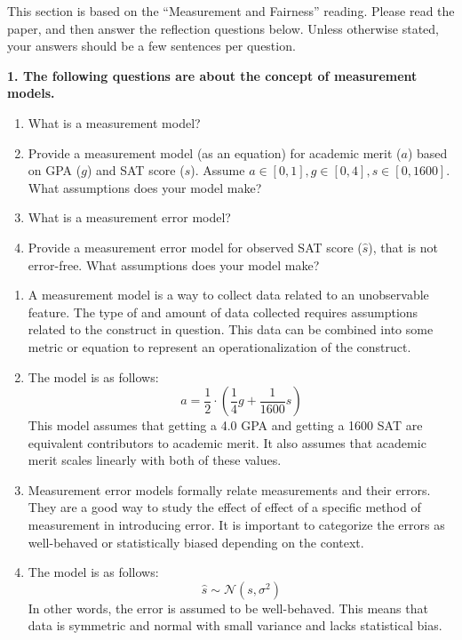 \documentclass{article}
\begin{document}
This section is based on the ``Measurement and Fairness'' reading. Please read the paper, and then answer the reflection questions below. Unless otherwise stated, your answers should be a few sentences per question.

\textbf{1. The following questions are about the concept of measurement models.}
\begin{enumerate}[label=\Alph*.]
    \item What is a measurement model?
    \item Provide a measurement model (as an equation) for academic merit ($a$) based on GPA ($g$) and SAT score ($s$). Assume $a \in [0,1], g \in [0, 4], s \in [0, 1600]$. What assumptions does your model make?
    \item What is a measurement error model?
    \item Provide a measurement error model for observed SAT score ($\hat{s}$), that is not error-free. What assumptions does your model make?
\end{enumerate}

\bigskip
\begin{mdframed}
\begin{enumerate}[label=\Alph*.]
\item A measurement model is a way to collect data related to an unobservable feature. The type of and amount of data collected requires assumptions related to the construct in question. This data can be combined into some metric or equation to represent an operationalization of the construct.
\item The model is as follows:$$a = \frac{1}{2}\cdot(\frac{1}{4}g + \frac{1}{1600}s)$$
This model assumes that getting a 4.0 GPA and getting a 1600 SAT are equivalent contributors to academic merit. It also assumes that academic merit scales linearly with both of these values.
\item Measurement error models formally relate measurements and their errors. They are a good way to study the effect of effect of a specific method of measurement in introducing error. It is important to categorize the errors as well-behaved or statistically biased depending on the context.
\item The model is as follows:$$\hat{s} \sim \mathcal{N}(s, \sigma^2)$$
In other words, the error is assumed to be well-behaved. This means that data is symmetric and normal with small variance and lacks statistical bias. 
\end{enumerate}
\end{mdframed}
\bigskip
\end{document}
